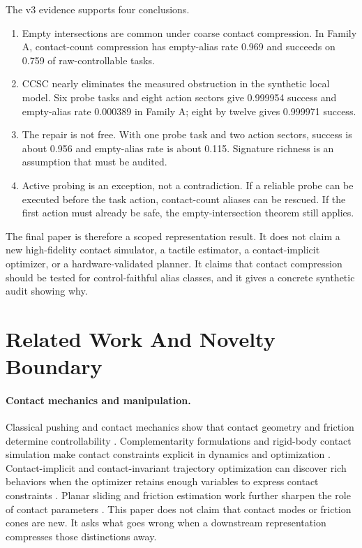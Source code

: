 \documentclass{article}
\begin{document}
The v3 evidence supports four conclusions.
\begin{enumerate}[leftmargin=*]
\item Empty intersections are common under coarse contact compression. In Family A, contact-count compression has empty-alias rate 0.969 and succeeds on 0.759 of raw-controllable tasks.
\item CCSC nearly eliminates the measured obstruction in the synthetic local model. Six probe tasks and eight action sectors give 0.999954 success and empty-alias rate 0.000389 in Family A; eight by twelve gives 0.999971 success.
\item The repair is not free. With one probe task and two action sectors, success is about 0.956 and empty-alias rate is about 0.115. Signature richness is an assumption that must be audited.
\item Active probing is an exception, not a contradiction. If a reliable probe can be executed before the task action, contact-count aliases can be rescued. If the first action must already be safe, the empty-intersection theorem still applies.
\end{enumerate}

The final paper is therefore a scoped representation result. It does not claim a new high-fidelity contact simulator, a tactile estimator, a contact-implicit optimizer, or a hardware-validated planner. It claims that contact compression should be tested for control-faithful alias classes, and it gives a concrete synthetic audit showing why.

\section{Related Work And Novelty Boundary}
\paragraph{Contact mechanics and manipulation.}
Classical pushing and contact mechanics show that contact geometry and friction determine controllability \citep{mason1986,lynch1996}. Complementarity formulations and rigid-body contact simulation make contact constraints explicit in dynamics and optimization \citep{stewart1996,anitescu1997,todorov2012}. Contact-implicit and contact-invariant trajectory optimization can discover rich behaviors when the optimizer retains enough variables to express contact constraints \citep{mordatch2012,posa2014,toussaint2015}. Planar sliding and friction estimation work further sharpen the role of contact parameters \citep{zhou2018,fazeli2017}. This paper does not claim that contact modes or friction cones are new. It asks what goes wrong when a downstream representation compresses those distinctions away.
\end{document}
